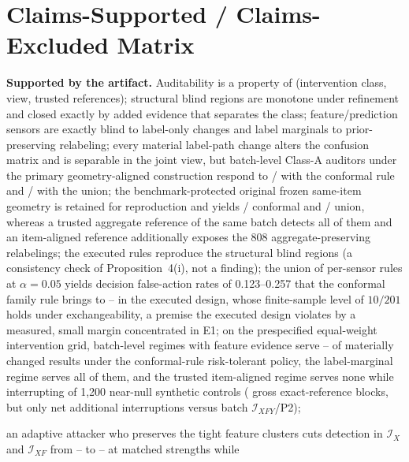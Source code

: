 \documentclass[10pt,journal,compsoc]{IEEEtran}
\newcommand{\IX}{\mathcal I_X}
\newcommand{\IXF}{\mathcal I_{XF}}
\newcommand{\IXFY}{\mathcal I_{XFY}}
\begin{document}
\clearpage
\section{Claims-Supported / Claims-Excluded Matrix}

{\sloppy
\textbf{Supported by the artifact.} Auditability is a property of
(intervention class, view, trusted references); structural blind regions are
monotone under refinement and closed exactly by added evidence that separates
the class; feature/prediction sensors are exactly blind to label-only changes
and label marginals to prior-preserving relabeling; every material label-path
change alters the confusion matrix and is separable in the joint view, but
batch-level Class-A auditors under the primary geometry-aligned construction
respond to \AlignedLabelFamilyFires{}/\AlignedLabelMaterialDen{} with the
conformal rule and \AlignedLabelUnionFires{}/\AlignedLabelMaterialDen{} with
the union; the benchmark-protected original frozen same-item geometry is
retained for reproduction and yields \BatchFamilyLabelFires{}/\NMaterialLabel{}
conformal and \BatchUnionLabelFires{}/\NMaterialLabel{} union, whereas a trusted aggregate reference of the same batch detects
all of them and an item-aligned reference additionally exposes the 808
aggregate-preserving relabelings; the executed rules reproduce the
structural blind regions (a consistency check of Proposition~4(i), not a
finding); the union of per-sensor rules at $\alpha=0.05$ yields decision
false-action rates of 0.123--0.257 that the conformal family rule brings to
\FprFamilyIYm--\FprFamilyIXF{} in the executed design, whose finite-sample
level of $10/201$ holds under exchangeability, a premise the executed design
violates by a measured, small margin concentrated in E1; on the prespecified
equal-weight intervention grid, batch-level
regimes with feature evidence serve
\UnsafeFamilyIXF--\UnsafeFamilyIX{} of \NMaterial{} materially changed
results under the conformal-rule risk-tolerant policy, the label-marginal regime
serves all of them, and the trusted item-aligned regime serves none while
interrupting \BenignInterruptFamilyIXFYtrusted{} of 1,200 near-null
synthetic controls (\TrustedGrossExactBlocks{} gross exact-reference blocks,
but only \TrustedNetAdditional{} net additional interruptions versus batch
$\IXFY$/P2);\par
\newpage
\noindent an adaptive
attacker who preserves the tight feature clusters cuts detection in $\IX$ and
$\IXF$ from \AdvDetCtrlHeadlineMin--\AdvDetCtrlHeadlineMax{} to
\AdvDetAdaptHeadlineMin--\AdvDetAdaptHeadlineMax{} at matched strengths while
}
\end{document}
